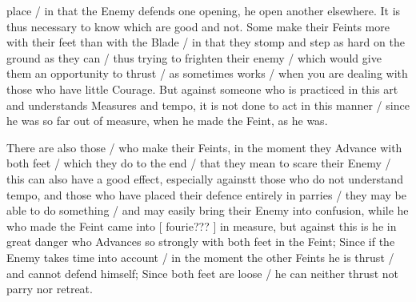 \newpage


\newpage



place / in that the Enemy defends one opening, he open another
elsewhere. It is thus necessary to know which are good and not. Some
make their Feints more with their feet than with the Blade / in that
they stomp and step as hard on the ground as they can / thus trying to
frighten their enemy / which would give them an opportunity to thrust
/ as sometimes works / when you are dealing with those who have little
Courage. But against someone who is practiced in this art and
understands Measures and tempo, it is not done to act in this manner /
since he was so far out of measure, when he made the Feint, as he was.


There are also those / who make their Feints, in the moment they
Advance with both feet / which they do to the end / that they mean to
scare their Enemy / this can also have a good effect, especially
againstt those who do not understand tempo, and those who have placed
their defence entirely in parries / they may be able to do something /
and may easily bring their Enemy into confusion, while he who made the
Feint came into [ fourie??? ] in measure, but against this is he in
great danger who Advances so strongly with both feet in the Feint;
Since if the Enemy takes time into account / in the moment the other
Feints he is thrust / and cannot defend himself; Since both feet are
loose / he can neither thrust not parry nor retreat.


